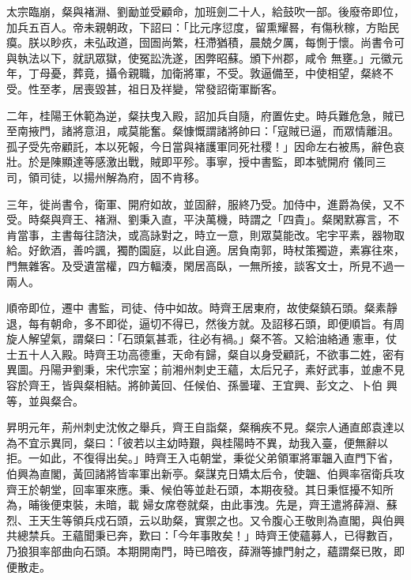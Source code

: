 \begin{pinyinscope}
 太宗臨崩，粲與褚淵、劉勔並受顧命，加班劍二十人，給鼓吹一部。後廢帝即位，加兵五百人。帝未親朝政，下詔曰：「比元序愆度，留熏耀晷，有傷秋稼，方貽民瘼。朕以眇疚，未弘政道，囹圄尚繁，枉滯猶積，晨兢夕厲，每惻于懷。尚書令可與執法以下，就訊眾獄，使冤訟洗遂，困弊昭蘇。頒下州郡，咸令
 無壅。」元徽元年，丁母憂，葬竟，攝令親職，加衛將軍，不受。敦逼備至，中使相望，粲終不受。性至孝，居喪毀甚，祖日及祥變，常發詔衛軍斷客。



 二年，桂陽王休範為逆，粲扶曳入殿，詔加兵自隨，府置佐史。時兵難危急，賊已至南掖門，諸將意沮，咸莫能奮。粲慷慨謂諸將帥曰：「寇賊已逼，而眾情離沮。孤子受先帝顧託，本以死報，今日當與褚護軍同死社稷！」因命左右被馬，辭色哀壯。於是陳顯達等感激出戰，賊即平殄。事寧，授中書監，即本號開府
 儀同三司，領司徒，以揚州解為府，固不肯移。



 三年，徙尚書令，衛軍、開府如故，並固辭，服終乃受。加侍中，進爵為侯，又不受。時粲與齊王、褚淵、劉秉入直，平決萬機，時謂之「四貴」。粲閑默寡言，不肯當事，主書每往諮決，或高詠對之，時立一意，則眾莫能改。宅宇平素，器物取給。好飲酒，善吟諷，獨酌園庭，以此自適。居負南郭，時杖策獨遊，素寡往來，門無雜客。及受遺當權，四方輻湊，閑居高臥，一無所接，談客文士，所見不過一兩人。



 順帝即位，遷中
 書監，司徒、侍中如故。時齊王居東府，故使粲鎮石頭。粲素靜退，每有朝命，多不即從，逼切不得已，然後方就。及詔移石頭，即便順旨。有周旋人解望氣，謂粲曰：「石頭氣甚乖，往必有禍。」粲不答。又給油絡通憲車，仗士五十人入殿。時齊王功高德重，天命有歸，粲自以身受顧託，不欲事二姓，密有異圖。丹陽尹劉秉，宋代宗室；前湘州刺史王蘊，太后兄子，素好武事，並慮不見容於齊王，皆與粲相結。將帥黃回、任候伯、孫曇瓘、王宜興、彭文之、卜伯
 興等，並與粲合。



 昇明元年，荊州刺史沈攸之舉兵，齊王自詣粲，粲稱疾不見。粲宗人通直郎袁達以為不宜示異同，粲曰：「彼若以主幼時艱，與桂陽時不異，劫我入臺，便無辭以拒。一如此，不復得出矣。」時齊王入屯朝堂，秉從父弟領軍將軍韞入直門下省，伯興為直閣，黃回諸將皆率軍出新亭。粲謀克日矯太后令，使韞、伯興率宿衛兵攻齊王於朝堂，回率軍來應。秉、候伯等並赴石頭，本期夜發。其日秉恇擾不知所為，晡後便束裝，未暗，載
 婦女席卷就粲，由此事洩。先是，齊王遣將薛淵、蘇烈、王天生等領兵戍石頭，云以助粲，實禦之也。又令腹心王敬則為直閣，與伯興共總禁兵。王蘊聞秉已奔，歎曰：「今年事敗矣！」時齊王使蘊募人，已得數百，乃狼狽率部曲向石頭。本期開南門，時已暗夜，薛淵等據門射之，蘊謂粲已敗，即便散走。




\end{pinyinscope}
